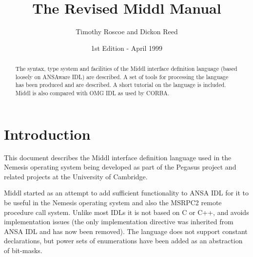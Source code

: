 \title{The Revised Middl Manual}
\author{Timothy Roscoe and Dickon Reed}
\date{1st Edition - April 1999}


\def\MIDDL{{\sc Middl}}

\newcommand{\idltabbing}[1] {
\begin{tabbing}
\=xxxxx \=xxxxx \=xxxxxxxxxxxxx \=xxxx \=xxxxxxxxxxxxx \=x
\kill #1 \\
\end{tabbing} }

\newcommand{\idlfragment}[1] {{\tt \idltabbing{#1}}}
\newcommand{\idlliteral}[1] {{\em $<$#1$>$}}
\newcommand{\idloptliteral}[1] {{\em [$<$#1$>$]}}
\newcommand{\idlfield}[3]{\> \> \> #1 \> #2 \> #3 }
\newcommand{\Middlc}{{\tt Middlc1} }


\maketitle
\begin{abstract}

The syntax, type system and facilities of the \MIDDL{} interface
definition language (based loosely on ANSAware IDL) are described.
A set of tools for processing the language has been produced and are
described. A short tutorial on the language is included. \MIDDL{} is also
compared with OMG IDL as used by CORBA.

\end{abstract}

\chapter{Introduction}

 This document describes the \MIDDL{} interface definition language used
in the Nemesis operating system being developed as part of the Pegasus
project and related projects at the University of Cambridge.

\MIDDL{} started as an attempt to add sufficient functionality to ANSA
IDL for it to be useful in the Nemesis operating system and also the
MSRPC2 remote procedure call system. Unlike most
IDLs it is not based on C or C++, and avoids
implementation issues (the only implementation directive was inherited
from ANSA IDL and has now been removed). The language does not support
constant declarations, but 
power sets of enumerations have been added as an abstraction of
bit-masks.  

